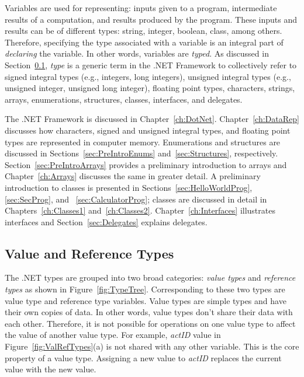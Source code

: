 Variables are used for representing: inputs given to a program,
intermediate results of a computation, and results produced by the
program. These inputs and results can be of different types:
string, integer, boolean, class, among others. Therefore,
specifying the type associated with a variable is an integral part
of \emph{declaring} the variable. In other words, variables are
\emph{typed}. As discussed in Section~\ref{sec:ValRefTypes},
\emph{type} is a generic term in the .NET Framework  to
collectively refer to signed integral types (e.g., integers, long
integers), unsigned integral types (e.g., unsigned integer,
unsigned long integer), floating point types, characters, strings,
arrays, enumerations, structures, classes, interfaces, and
delegates.


The .NET Framework is discussed in Chapter~\ref{ch:DotNet}.
Chapter~\ref{ch:DataRep} discusses how characters, signed and
unsigned integral types, and floating point types are represented
in computer memory. Enumerations and structures are discussed in
Sections~\ref{sec:PreIntroEnums} and~\ref{sec:Structures},
respectively. Section~\ref{sec:PreIntroArrays} provides a
preliminary introduction to arrays and Chapter~\ref{ch:Arrays}
discusses the same in greater detail. A preliminary introduction
to classes is presented in Sections~\ref{sec:HelloWorldProg},
\ref{sec:SecProg}, and ~\ref{sec:CalculatorProg}; classes are
discussed in detail in Chapters~\ref{ch:Classes1}
and~\ref{ch:Classes2}. Chapter~\ref{ch:Interfaces} illustrates
interfaces and Section~\ref{sec:Delegates} explains delegates.



\subsection{Value and Reference Types} \label{sec:ValRefTypes}


The .NET types are grouped into two broad categories: \emph{value
types} and \emph{reference types} as shown in
Figure~\ref{fig:TypeTree}. Corresponding to these two types are
value type and reference type variables. Value types are simple
types and have their own copies of data. In other words, value
types don't share their data with each other. Therefore, it is not
possible for operations on one value type to affect the value of
another value type. For example, \emph{actID} value in
Figure~\ref{fig:ValRefTypes}(a) is not shared with any other
variable. This is the core property of a value type. Assigning a
new value to \emph{actID} replaces the current value with the new
value.


